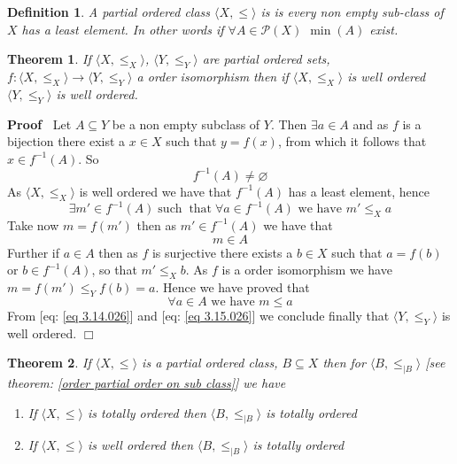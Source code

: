 \documentclass{book}
\newcommand{\tmop}[1]{\ensuremath{\operatorname{#1}}}
\newcommand{\tmtextbf}[1]{\text{{\bfseries{#1}}}}
\newenvironment{proof}{\noindent\textbf{Proof\ }}{\hspace*{\fill}$\Box$\medskip}
\newtheorem{definition}{Definition}
{\theorembodyfont{\rmfamily}\newtheorem{example}{Example}}
\newtheorem{theorem}{Theorem}
\begin{document}
\begin{definition}
  \label{order well-rodered class}{}A partial
  ordered class $\langle X, \leqslant \rangle$ is \tmtextbf{well ordered} is
  every non empty sub-class of $X$ has a least element. In other words if
  $\forall A \in \mathcal{P} (X)$ $\min (A)$ exist.
\end{definition}

\begin{theorem}
  \label{order well ordering and order isomorphism}If $\langle X, \leqslant_X
  \rangle$, $\langle Y, \leqslant_Y \rangle$ are partial ordered sets, $f :
  \langle X, \leqslant_X \rangle \rightarrow \langle Y, \leqslant_Y \rangle$ a
  order isomorphism then if $\langle X, \leqslant_X \rangle$ is well ordered
  $\langle Y, \leqslant_Y \rangle$ is well ordered.
\end{theorem}

\begin{proof}
  Let $A \subseteq Y$ be a non empty subclass of $Y$. Then $\exists a \in A$
  and as $f$ is a bijection there exist a $x \in X$ such that $y = f (x)$,
  from which it follows that $x \in f^{- 1} (A)$. So
  \[ f^{- 1} (A) \neq \varnothing \]
  As $\langle X, \leqslant_X \rangle$ is well ordered we have that $f^{- 1}
  (A)$ has a least element, hence
  \[ \exists m' \in f^{- 1} (A) \tmop{such} \tmop{that} \forall a \in f^{- 1}
     (A) \text{ we have } m' \leqslant_X a \]
  Take now $m = f (m')$ then as $m' \in f^{- 1} (A)$ we have that
  \begin{equation}
    \label{eq 3.14.026} m \in A
  \end{equation}
  Further if $a \in A$ then as $f$ is surjective there exists a $b \in X$ such
  that $a = f (b)$ or $b \in f^{- 1} (A)$, so that $m' \leqslant_X b$. As $f$
  is a order isomorphism we have $m = f (m') \leqslant_Y f (b) = a$. Hence we
  have proved that
  \begin{equation}
    \label{eq 3.15.026} \forall a \in A \text{ we have } m \leqslant a
  \end{equation}
  From [eq: \ref{eq 3.14.026}] and [eq: \ref{eq 3.15.026}] we conclude finally
  that $\langle Y, \leqslant_Y \rangle$ is well ordered.
\end{proof}

\begin{theorem}
  \label{order total/well-order inclusion}If $\langle X, \leqslant \rangle$ is
  a partial ordered class, $B \subseteq X$ then for $\langle B, \leqslant_{|B}
  \rangle$ [see theorem: \ref{order partial order on sub class}] we have
  \begin{enumerate}
    \item If $\langle X, \leqslant \rangle$ is totally ordered then $\langle
    B, \leqslant_{|B} \rangle$ is totally ordered
    
    \item If $\langle X, \leqslant \rangle$ is well ordered then $\langle B,
    \leqslant_{|B} \rangle$ is totally ordered
  \end{enumerate}
\end{theorem}
\end{document}
